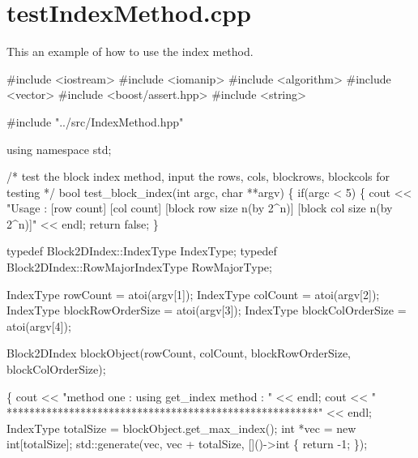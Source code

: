 \section{test\-Index\-Method.\-cpp}
This an example of how to use the index method.


\begin{DoxyCodeInclude}
\textcolor{preprocessor}{#include <iostream>}
\textcolor{preprocessor}{#include <iomanip>}
\textcolor{preprocessor}{#include <algorithm>}
\textcolor{preprocessor}{#include <vector>}
\textcolor{preprocessor}{#include <boost/assert.hpp>}
\textcolor{preprocessor}{#include <string>}

\textcolor{preprocessor}{#include "../src/IndexMethod.hpp"}

\textcolor{keyword}{using namespace }std;

\textcolor{comment}{/* test the block index method, input the rows, cols, blockrows, blockcols for
       testing */}
\textcolor{keywordtype}{bool} test\_block\_index(\textcolor{keywordtype}{int} argc, \textcolor{keywordtype}{char} **argv)
\{
        \textcolor{keywordflow}{if}(argc < 5) \{
                cout << \textcolor{stringliteral}{"Usage : [row count] [col count] [block row size n(by
       2^n)] [block col size n(by 2^n)]"} << endl;
                \textcolor{keywordflow}{return} \textcolor{keyword}{false};
        \}

        \textcolor{keyword}{typedef} Block2DIndex::IndexType IndexType;
        \textcolor{keyword}{typedef} Block2DIndex::RowMajorIndexType RowMajorType;

        IndexType rowCount = atoi(argv[1]);
        IndexType colCount = atoi(argv[2]);
        IndexType blockRowOrderSize = atoi(argv[3]);
        IndexType blockColOrderSize = atoi(argv[4]);

        Block2DIndex blockObject(rowCount, colCount, blockRowOrderSize, 
      blockColOrderSize);

        \{
                cout << \textcolor{stringliteral}{"method one : using get\_index method : "} << endl;
                cout << \textcolor{stringliteral}{"
      *******************************************************"} << endl;
                IndexType totalSize = blockObject.get_max_index();
                \textcolor{keywordtype}{int} *vec = \textcolor{keyword}{new} \textcolor{keywordtype}{int}[totalSize];
                std::generate(vec, vec + totalSize, []()->\textcolor{keywordtype}{int} \{
                        \textcolor{keywordflow}{return} -1;
                \});


\end{DoxyCodeInclude}
